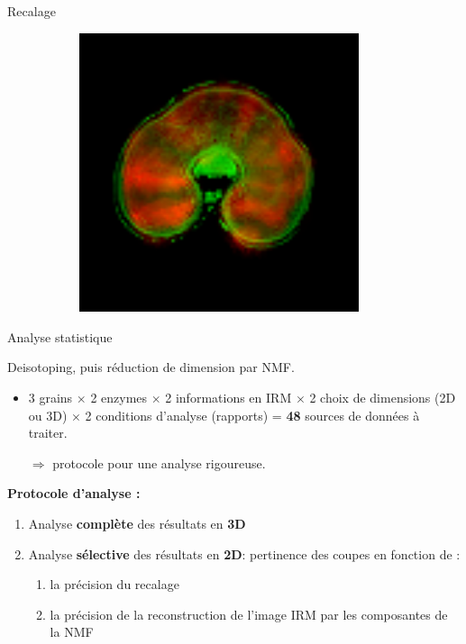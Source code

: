 \documentclass[10pt]{beamer}
\begin{document}
\begin{frame}{Recalage}
\begin{figure}[ht]
\begin{subfigure}[t]{0.33\textwidth}
      \caption{}
      \label{subfig:recalage_500Xyl_2}
    \end{subfigure}%
    \begin{subfigure}[t]{0.33\textwidth}
      \centering
      \includegraphics[width=0.9\textwidth]{fig/recalage_500Xyl_8}
      \caption{}
      \label{subfig:recalage_500Xyl_8}
    \end{subfigure}%
  \end{figure}


\end{frame}

\begin{frame}{Analyse statistique}
  
  Deisotoping, puis réduction de dimension par NMF.
  \begin{itemize}
  \item 3 grains $\times$ 2 enzymes $\times$ 2 informations en IRM $\times$ 2 choix de dimensions (2D ou 3D) $\times$ 2 conditions d'analyse (rapports) = \textbf{48} sources de données à traiter.
    
    $\Rightarrow$ protocole pour une analyse rigoureuse.
  \end{itemize}
  
  \textbf{Protocole d'analyse :}
  \begin{enumerate}
  \item Analyse \textbf{complète} des résultats en \textbf{3D}
  \item Analyse \textbf{sélective} des résultats en \textbf{2D}: pertinence des coupes en fonction de :
    \begin{enumerate}
    \item la précision du recalage
    \item la précision de la reconstruction de l'image IRM par les composantes de la NMF
    \end{enumerate}
  \end{enumerate}

\end{frame}
\end{document}
